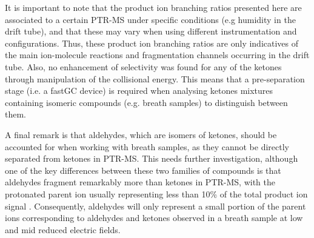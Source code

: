 

It is important to note that the product ion branching ratios presented here are associated to a certain PTR-MS under specific conditions (e.g humidity in the drift tube), and that these may vary when using different instrumentation and configurations. Thus, these product ion branching ratios are only indicatives of the main ion-molecule reactions and fragmentation channels occurring in the drift tube.
Also, no enhancement of selectivity was found for any of the ketones through manipulation of the collisional energy.
This means that a pre-separation stage (i.e. a fastGC device) is required when analysing ketones mixtures containing isomeric compounds (e.g. breath samples) to distinguish between them.





A final remark is that aldehydes, which are isomers of ketones, should be accounted for when working with breath samples, as they cannot be directly separated from ketones in PTR-MS.
This needs further investigation, although one of the key differences between these two families of compounds is that aldehydes fragment remarkably more than ketones in PTR-MS, with the protonated parent ion usually representing less than 10\% of the total product ion signal \cite{buhr2002analysis,schwarz2009determining}. 
Consequently, aldehydes will only represent a small portion of the parent ions corresponding to aldehydes and ketones observed in a breath sample at low and mid reduced electric fields.








